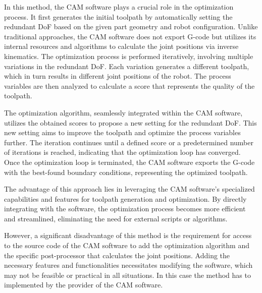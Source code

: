 In this method, the \acrshort{CAM} software plays a crucial role in the optimization process. It first generates the initial toolpath by automatically setting the redundant \acrshort{DoF} based on the given part geometry and robot configuration. Unlike traditional approaches, the \acrshort{CAM} software does not export G-code but utilizes its internal resources and algorithms to calculate the joint positions via inverse kinematics. The optimization process is performed iteratively, involving multiple variations in the redundant \acrshort{DoF}. Each variation generates a different toolpath, which in turn results in different joint positions of the robot. The process variables are then analyzed to calculate a score that represents the quality of the toolpath.

The optimization algorithm, seamlessly integrated within the \acrshort{CAM} software, utilizes the obtained scores to propose a new setting for the redundant \acrshort{DoF}. This new setting aims to improve the toolpath and optimize the process variables further. The iteration continues until a defined score or a predetermined number of iterations is reached, indicating that the optimization loop has converged.
Once the optimization loop is terminated, the \acrshort{CAM} software exports the G-code with the best-found boundary conditions, representing the optimized toolpath.

The advantage of this approach lies in leveraging the \acrshort{CAM} software's specialized capabilities and features for toolpath generation and optimization. By directly integrating with the software, the optimization process becomes more efficient and streamlined, eliminating the need for external scripts or algorithms.

However, a significant disadvantage of this method is the requirement for access to the source code of the \acrshort{CAM} software to add the optimization algorithm and the specific post-processor that calculates the joint positions. Adding the necessary features and functionalities necessitates modifying the software, which may not be feasible or practical in all situations. In this case the method has to implemented by the provider of the \acrshort{CAM} software.